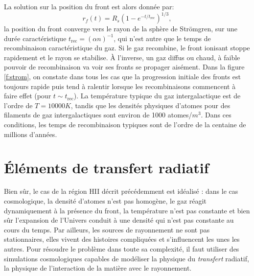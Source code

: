 La solution sur la position du front  est alors donnée par:
\begin{equation}
r_f(t)=R_s(1-e^{-t/t_\mathrm{rec}})^{1/3},
\end{equation}
la position du front converge vers le rayon de la sphère de Strömgren, sur une durée caractéristique $t_\mathrm{rec}=(\alpha n)^{-1}$, qui n'est autre que le temps de recombinaison caractéristique du gaz. Si le gaz recombine, le front ionisant stoppe rapidement et le rayon se stabilise. À l'inverse, un gaz diffus ou chaud, à faible pouvoir de recombinaison va voir ses fronts se propager aisément. Dans la figure \ref{f:strom}, on constate dans tous les cas que la progression initiale des fronts est toujours rapide puis tend à ralentir lorsque les recombinaisons commencent à faire effet (pour $t\sim t_\mathrm{rec}$). La température typique du gaz intergalactique est de l'ordre de $T=10 000 K$, tandis que les densités physiques d'atomes pour des filaments de gaz intergalactiques sont environ de 1000 atomes/$m^3$. Dans ces conditions, les temps de recombinaison typiques sont de l'ordre de la centaine de millions d'années.

\section{Éléments de transfert radiatif}

Bien sûr, le cas de la région HII décrit précédemment est idéalisé : dans le cas cosmologique, la densité d'atomes n'est pas homogène, le gaz réagit dynamiquement à la présence du front, la température n'est pas constante et bien sûr l'expansion de l'Univers conduit à une densité qui n'est pas constante au cours du temps. Par ailleurs, les sources de rayonnement ne sont pas stationnaires, elles vivent des histoires compliquées et s'influencent les unes les autres. Pour résoudre le problème dans toute sa complexité, il faut utiliser des simulations cosmologiques capables de modéliser la physique du \textit{transfert} radiatif, la physique de l'interaction de la matière avec le rayonnement. 

